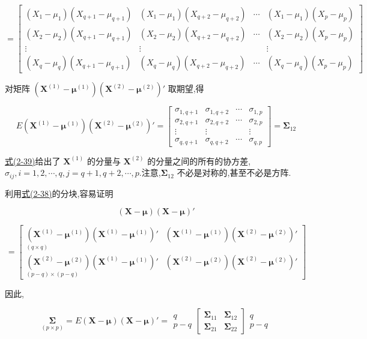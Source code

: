 \[
=\begin{bmatrix}
(X_1-\mu_1)(X_{q+1}-\mu_{q+1}) & (X_1-\mu_1)(X_{q+2}-\mu_{q+2}) & \cdots & (X_1-\mu_1)(X_p-\mu_p)\\
(X_2-\mu_2)(X_{q+1}-\mu_{q+1}) & (X_2-\mu_2)(X_{q+2}-\mu_{q+2}) & \cdots & (X_2-\mu_2)(X_p-\mu_p)\\
\vdots & \vdots & & \vdots\\
(X_q-\mu_q)(X_{q+1}-\mu_{q+1}) & (X_q-\mu_q)(X_{q+2}-\mu_{q+2}) & \cdots & (X_q-\mu_q)(X_p-\mu_p)
\end{bmatrix}
\]

对矩阵 $(\bm{X}^{(1)}-\bm{\mu}^{(1)})(\bm{X}^{(2)}-\bm{\mu}^{(2)})'$ 取期望,得

\label{eq:2-39}
\begin{equation}
E(\bm{X}^{(1)}-\bm{\mu}^{(1)})(\bm{X}^{(2)}-\bm{\mu}^{(2)})'=\begin{bmatrix}
\sigma_{1,q+1} & \sigma_{1,q+2} & \cdots & \sigma_{1,p}\\
\sigma_{2,q+1} & \sigma_{2,q+2} & \cdots & \sigma_{2,p}\\
\vdots & \vdots & & \vdots\\
\sigma_{q,q+1} & \sigma_{q,q+2} & \cdots & \sigma_{q,p}
\end{bmatrix}=\bm{\Sigma}_{12} \tag{2-39}
\end{equation}

\hyperref[eq:2-39]{式(2-39)}给出了 $\bm{X}^{(1)}$ 的分量与 $\bm{X}^{(2)}$ 的分量之间的所有的协方差,$\sigma_{ij},i=1,2,\cdots,q,j=q+1,q+2,\cdots,p$.注意,$\bm{\Sigma}_{12}$ 不必是对称的,甚至不必是方阵.

利用\hyperref[eq:2-38]{式(2-38)}的分块,容易证明

\[
(\bm{X}-\bm{\mu})(\bm{X}-\bm{\mu})'
\]

\[
=\begin{bmatrix}
(\bm{X}^{(1)}-\bm{\mu}^{(1)})(\bm{X}^{(1)}-\bm{\mu}^{(1)})' & (\bm{X}^{(1)}-\bm{\mu}^{(1)})(\bm{X}^{(2)}-\bm{\mu}^{(2)})'\\
{}_{(q\times q)}\\
(\bm{X}^{(2)}-\bm{\mu}^{(2)})(\bm{X}^{(1)}-\bm{\mu}^{(1)})' & (\bm{X}^{(2)}-\bm{\mu}^{(2)})(\bm{X}^{(2)}-\bm{\mu}^{(2)})'\\
{}_{(p-q)\times(p-q)}
\end{bmatrix}
\]

因此,

\label{eq:2-40}
\begin{equation}
\underset{(p\times p)}{\bm{\Sigma}}=E(\bm{X}-\bm{\mu})(\bm{X}-\bm{\mu})'=\begin{array}{c}q\\p-q\end{array}\begin{bmatrix}\bm{\Sigma}_{11} & \bm{\Sigma}_{12}\\\bm{\Sigma}_{21} & \bm{\Sigma}_{22}\end{bmatrix}\begin{array}{c}q\\p-q\end{array} \tag{2-40}
\end{equation}

